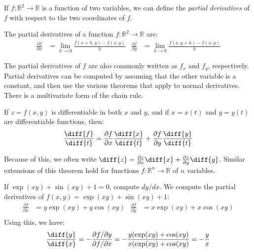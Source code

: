 \documentclass[crop=false,class=article,oneside]{standalone}
\begin{document}
        If $f:\mathbb{R}^{2}\rightarrow\mathbb{R}$ is a function
        of two variables, we can define the
        \textit{partial derivatives} of $f$ with respect to
        the two coordinates of $f$.
        \begin{definition}
            The partial derivatives of a function
            $f:\mathbb{R}^{2}\rightarrow\mathbb{R}$ are:
            \begin{align*}
                \frac{\partial{f}}{\partial{x}}
                &=\lim_{h\rightarrow{0}}\frac{f(x+h,y)-f(x,y)}{h}
                &
                \frac{\partial{f}}{\partial{y}}
                &=\lim_{h\rightarrow{0}}\frac{f(x,y+h)-f(x,y)}{h}  
            \end{align*}
        \end{definition}
        The partial derivatives of $f$ are also commonly written as
        $f_{x}$ and $f_{y}$, respectively. Partial derivatives can be
        computed by assuming that the other variable is a constant,
        and then use the various theorems that apply to normal
        derivatives. There is a multivariate form of the chain rule.
        \begin{theorem}
            If $z=f(x,y)$ is differentiable in both $x$ and $y$, and
            if $x=x(t)$ and $y=y(t)$ are differentiable functions, then:
            \begin{equation*}
                \frac{\diff{f}}{\diff{t}}
                =\frac{\partial{f}}{\partial{x}}\frac{\diff{x}}{\diff{t}}
                +\frac{\partial{f}}{\partial{y}}\frac{\diff{y}}{\diff{t}}
            \end{equation*}
        \end{theorem}
        Because of this, we often write
        $\diff{z}=\frac{\partial{z}}{\partial{x}}\diff{x}%
         +\frac{\partial{z}}{\partial{y}}\diff{y}$.
        Similar extensions of this theorem hold for functions
        $f:\mathbb{R}^{n}\rightarrow\mathbb{R}$ of $n$ variables.
        \begin{example}
            If $\exp(xy)+\sin(xy)+1=0$, compute $dy/dx$. We compute
            the partial derivatives of $f(x,y)=\exp(xy)+\sin(xy)+1$:
            \begin{align*}
                \frac{\partial{f}}{\partial{x}}
                &=y\exp(xy)+y\cos(xy)
                &
                \frac{\partial{f}}{\partial{y}}
                &=x\exp(xy)+x\cos(xy)\\
            \end{align*}
            Using this, we have:
            \begin{equation*}
                \frac{\diff{y}}{\diff{x}}
                =-\frac{\partial{f}/\partial{y}}{\partial{f}/\partial{x}}
                =-\frac{y(\exp(xy)+\cos(xy)}{x(\exp(xy)+\cos(xy)}
                =-\frac{y}{x}
            \end{equation*}
        \end{example}
\end{document}
